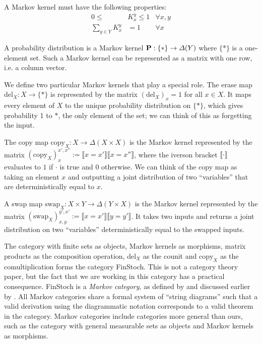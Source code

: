 A Markov kernel must have the following properties:
\begin{align}
	0\leq &K_{x}^y \leq 1 &\forall x,y\\
	\sum_{y\in Y} K_{x}^y &= 1 & \forall x
\end{align}

A probability distribution is a Markov kernel $\mathbf{P}:\{*\}\to \Delta(Y)$ where $\{*\}$ is a one-element set. Such a Markov kernel can be represented as a matrix with one row, i.e. a column vector.

We define two particular Markov kernels that play a special role. The erase map $\text{del}_X:X\to \{*\}$ is represented by the matrix $(\text{del}_X)_x = 1$ for all $x\in X$. It maps every element of $X$ to the unique probability distribution on $\{*\}$, which gives probability 1 to $*$, the only element of the set; we can think of this as forgetting the input.

The copy map $\text{copy}_X: X\to \Delta(X\times X)$ is the Markov kernel represented by the matrix $(\text{copy}_X)_x^{x',x''}:= \llbracket x = x' \rrbracket \llbracket x=x''\rrbracket$, where the iverson bracket $\llbracket \cdot \rrbracket$ evaluates to $1$ if $\cdot$ is true and $0$ otherwise. We can think of the copy map as taking an element $x$ and outputting a joint distribution of two ``variables'' that are deterministically equal to $x$.

A swap map $\text{swap}_X: X\times Y \to \Delta(Y\times X)$ is the Markov kernel represented by the matrix $(\text{swap}_X)_{x,y}^{y',x'}:=\llbracket x=x' \rrbracket \llbracket y=y'\rrbracket$. It takes two inputs and returns a joint distribution on two ``variables'' deterministically equal to the swapped inputs.

The category with finite sets as objects, Markov kernels as morphisms, matrix products as the composition operation, $\text{del}_X$ as the counit and $\text{copy}_X$ as the comultiplication forms the category FinStoch. This is not a category theory paper, but the fact that we are working in this category has a practical consequence. FinStoch is a \emph{Markov category}, as defined by \citet{fritz_synthetic_2020} and discussed earlier by \citet{cho_disintegration_2019,fong_causal_2013}. All Markov categories share a formal system of ``string diagrams'' such that a valid derivation using the diagrammatic notation corresponds to a valid theorem in the category. Markov categories include categories more general than ours, such as the category with general measurable sets as objects and Markov kernels as morphisms.

